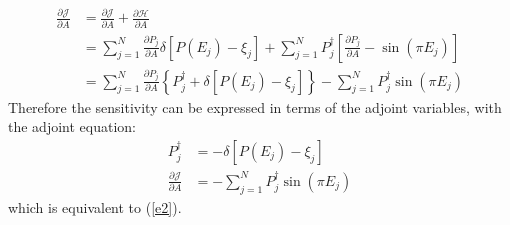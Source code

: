 \documentclass[11pt]{article}
\def\Dpartial#1#2{ \frac{\partial #1}{\partial #2} }
\newcommand{\cH}{\mathcal{H}}
\newcommand{\cJ}{\mathcal{J}}
\begin{document}
\begin{equation*}
\begin{split}
\Dpartial{\cJ}{A} &= \Dpartial{\cJ}{A} + \Dpartial{\cH}{A}\\
&= \sum_{j=1}^N \Dpartial{P_j}{A}\delta\left[ P(E_j) - \xi_j \right] + \sum_{j=1}^N P_j^{\dagger}\left[ \Dpartial{P_j}{A} - \sin\left( \pi E_j \right) \right]\\
&= \sum_{j=1}^N \Dpartial{P_j}{A}\left\{ P_j^{\dagger} + \delta\left[ P(E_j) - \xi_j \right] \right\} - \sum_{j=1}^N P_j^{\dagger}\sin\left( \pi E_j \right)
\end{split}
\end{equation*}
Therefore the sensitivity can be expressed in terms of the adjoint variables,
with the adjoint equation:
\begin{equation}
\begin{split}
P_j^{\dagger} &= - \delta\left[ P(E_j) - \xi_j \right]\\
\Dpartial{\cJ}{A} &= - \sum_{j=1}^N P_j^{\dagger}\sin\left( \pi E_j \right)
\label{e3}
\end{split}
\end{equation}
which is equivalent to (\ref{e2}).
\end{document}

